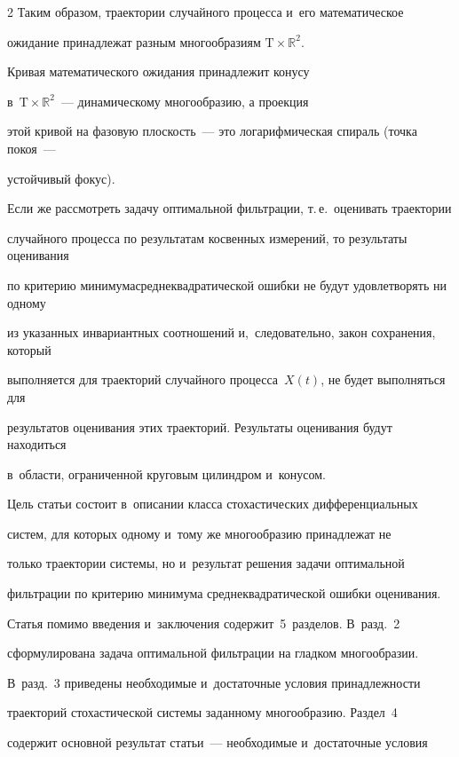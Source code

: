 \begin{multicols}{2}
Таким образом, траектории случайного процесса и~его математическое 

ожидание принадлежат разным многообразиям $\mathrm{T} \times \mathds{R}^2$. 

Кривая математического ожидания принадлежит конусу 

в~$\mathrm{T} \times \mathds{R}^2$~--- динамическому многообразию, а проекция 

этой кривой на фазовую плоскость~--- это логарифмическая спираль (точка покоя~--- 

устойчивый фокус).



Если же рассмотреть задачу оптимальной фильт\-ра\-ции, т.\,е.\ оценивать траектории 

случайного процесса по результатам косвенных измерений, то результаты оценивания 

по критерию минимума\linebreak среднеквадратической ошибки не будут удовлетворять ни одному 

из указанных инвариантных соотношений и,~следовательно, закон сохранения, который 

выполняется для траекторий случайного процесса~$X(t)$, не будет выполняться для 

результатов оценивания этих траекторий. Результаты оценивания будут находиться 

в~об\-ласти, ограниченной круговым цилиндром и~конусом.



Цель статьи состоит в~описании класса стохастических дифференциальных 

систем, для которых одному и~тому же многообразию принадлежат не 

только траектории системы, но и~результат решения задачи оптимальной 

фильтрации по критерию минимума среднеквадратической ошибки оценивания.



Статья помимо введения и~заключения содержит~5~разделов. В~разд.~2 

сформулирована задача оптимальной фильтрации на гладком многообразии. 

В~разд.~3 приведены необходимые и~достаточные условия принадлежности 

траекторий стохастической системы заданному многообразию. Раздел~4 

содержит основной результат статьи~--- необходимые и~достаточные условия


\end{multicols}
